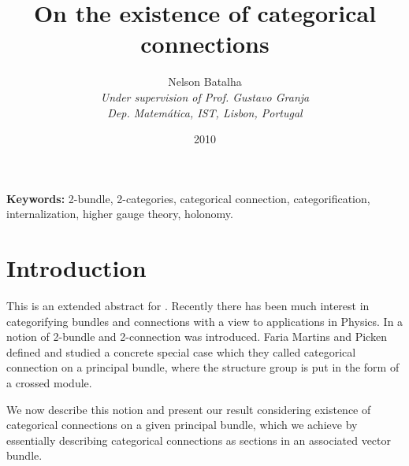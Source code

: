 \documentclass[11pt,a4]{article} %
\begin{document}
%
%
\title{On the existence of categorical connections}
\author{Nelson Batalha\\
\textit{Under supervision of Prof. Gustavo Granja}\\ %
\textit{Dep. Matemática, IST, Lisbon, Portugal}}
\date{2010}
\maketitle

\bigskip
\textbf{\Large Keywords:} 2-bundle, 2-categories, categorical connection, categorification, internalization, higher gauge theory, holonomy.
\bigskip
%
\section{Introduction}

This is an extended abstract for \cite{nelson}. Recently there has been much interest in categorifying bundles and connections with a view to applications in Physics. In \cite{baez-2004} a notion of 2-bundle and 2-connection was introduced. Faria Martins and Picken defined and studied a concrete special case which they called categorical connection on a principal bundle, where the structure group is put in the form of a crossed module.

We now describe this notion and present our result considering existence of categorical connections on a given principal bundle, which we achieve by essentially describing categorical connections as sections in an associated vector bundle.




\end{document}
